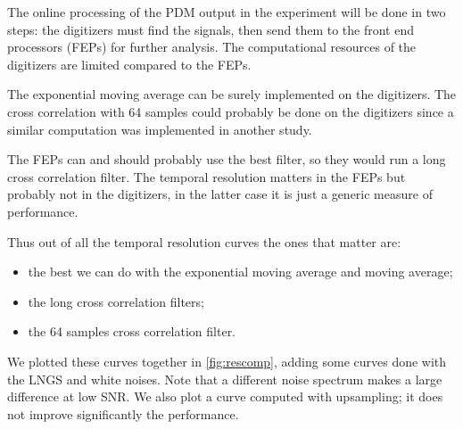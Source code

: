 \begin{figure}
    
    

\end{figure}

The online processing of the PDM output in the experiment will be done in two
steps: the digitizers must find the signals, then send them to the front end
processors (FEPs) for further analysis. The computational resources of the
digitizers are limited compared to the FEPs.

The exponential moving average can be surely implemented on the digitizers. The
cross correlation with 64 samples could probably be done on the digitizers
since a similar computation was implemented in another study.

The FEPs can and should probably use the best filter, so they would run a long
cross correlation filter. The temporal resolution matters in the FEPs but
probably not in the digitizers, in the latter case it is just a generic measure
of performance.

Thus out of all the temporal resolution curves the ones that matter are:
%
\begin{itemize}
    \item the best we can do with the exponential moving average and moving
    average;
    \item the long cross correlation filters;
    \item the 64 samples cross correlation filter.
\end{itemize}
%
We plotted these curves together in \autoref{fig:rescomp}, adding some
curves done with the LNGS and white noises. Note that a different noise
spectrum makes a large difference at low SNR. We also plot a curve computed
with upsampling; it does not improve significantly the performance.

\begin{figure}
    
    

\end{figure}

